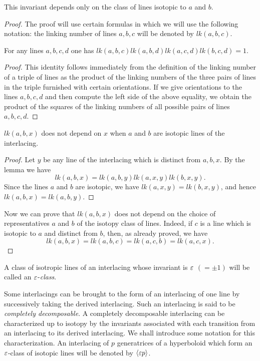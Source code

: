 \documentclass{article}
\begin{document}
\begin{Th} 
This invariant depends only on the class of lines isotopic to $a$ and $b$.
\end{Th}
\begin{proof}
The proof will use certain formulas in which we will use the following
notation: the linking number of lines $a,b,c$ will be denoted by
$lk(a,b,c)$.

\begin{lem} 
 For any lines $a,b,c,d$ one has
$lk(a,b,c)lk(a,b,d)lk(a,c,d)lk(b,c,d)=1.$
\end{lem}


\begin{proof}
This identity follows immediately from the definition of the linking
number of a triple of lines as the product of the linking numbers of
the three pairs of lines in the triple furnished with certain orientations. If
we give orientations to the lines $a,b,c,d$ and then compute the left side of
the above equality, we obtain the product of the squares of the linking
numbers of all possible pairs of lines $a,b,c,d.$ 
\end{proof}

\begin{lem} 
$lk(a,b,x)$ does not depend on $x$ when $a$ and $b$ are
isotopic lines of the interlacing. 
\end{lem}
\begin{proof}
Let $y$ be any line of the interlacing 
which is distinct from $a,b,x$. By the lemma we have
$$lk(a,b,x)=lk(a,b,y)lk(a,x,y)lk(b,x,y).$$
Since the  lines $a$ and $b$ are isotopic, we have $lk(a,x,y)=lk(b,x,y)$, and
hence $lk(a,b,x)=lk(a,b,y)$.
\end{proof}

Now we can prove that $lk(a,b,x)$ does not depend on the choice of
representatives $a$ and $b$ of the isotopy class of lines. Indeed, 
if $c$ is a line which is isotopic to $a$ and distinct from $b$, 
then, as already proved, we have
$$lk(a,b,x)=lk(a,b,c)=lk(a,c,b)=lk(a,c,x).$$
\end{proof}


A class of isotropic lines of an interlacing whose invariant is $\varepsilon$
 $(=\pm1)$ will be called an $\varepsilon$-{\it class\/}.

Some interlacings can be brought to the form of an interlacing of one line by
successively taking the derived interlacing. Such an interlacing is said to be
{\em completely decomposable\/}. A completely decomposable interlacing can be
characterized up to isotopy by the invariants associated with each transition
from an interlacing to its derived interlacing. We shall introduce some
notation for this characterization. An interlacing of $p$ generatrices of a
hyperboloid which form an $\varepsilon$-class of isotopic lines will be denoted by
$\langle\varepsilon p\rangle$.
\end{document}
